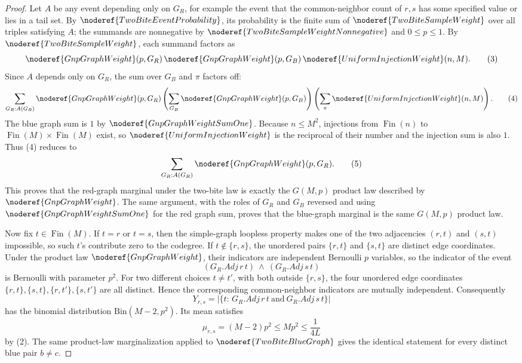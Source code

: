 \begin{proof}
Let \(A\) be any event depending only on \(G_R\), for example the event that
the common-neighbor count of \(r,s\) has some specified value or lies in a
tail set.  By \(\noderef{TwoBiteEventProbability}\), its probability is the
finite sum of \(\noderef{TwoBiteSampleWeight}\) over all triples satisfying
\(A\); the summands are nonnegative by
\(\noderef{TwoBiteSampleWeightNonnegative}\) and \(0\le p\le1\).  By
\(\noderef{TwoBiteSampleWeight}\), each summand factors as
\[
\noderef{GnpGraphWeight}(p,G_R)\,
\noderef{GnpGraphWeight}(p,G_B)\,
\noderef{UniformInjectionWeight}(n,M).
\tag{3}
\]
Since \(A\) depends only on \(G_R\), the sum over \(G_B\) and \(\pi\) factors
off:
\[
\sum_{G_R:A(G_R)} \noderef{GnpGraphWeight}(p,G_R)
\left(\sum_{G_B}\noderef{GnpGraphWeight}(p,G_B)\right)
\left(\sum_{\pi}\noderef{UniformInjectionWeight}(n,M)\right).
\tag{4}
\]
The blue graph sum is \(1\) by \(\noderef{GnpGraphWeightSumOne}\).  Because
\(n\le M^2\), injections from \(\operatorname{Fin}(n)\) to
\(\operatorname{Fin}(M)\times\operatorname{Fin}(M)\) exist, so
\(\noderef{UniformInjectionWeight}\) is the reciprocal of their number and
the injection sum is also \(1\).  Thus (4) reduces to
\[
\sum_{G_R:A(G_R)}\noderef{GnpGraphWeight}(p,G_R).
\tag{5}
\]
This proves that the red-graph marginal under the two-bite law is exactly
the \(G(M,p)\) product law described by \(\noderef{GnpGraphWeight}\).
The same argument, with the roles of \(G_R\) and \(G_B\) reversed and using
\(\noderef{GnpGraphWeightSumOne}\) for the red graph sum, proves that the
blue-graph marginal is the same \(G(M,p)\) product law.

Now fix \(t\in\operatorname{Fin}(M)\).  If \(t=r\) or \(t=s\), then the
simple-graph loopless property makes one of the two adjacencies
\((r,t)\) and \((s,t)\) impossible, so such \(t\)'s contribute zero to the
codegree.  If \(t\notin\{r,s\}\), the unordered pairs \(\{r,t\}\) and
\(\{s,t\}\) are distinct edge coordinates.  Under the product law
\(\noderef{GnpGraphWeight}\), their indicators are independent Bernoulli
\(p\) variables, so the indicator of the event
\[
(G_R.Adj\, r\, t)\ \wedge\ (G_R.Adj\, s\, t)
\]
is Bernoulli with parameter \(p^2\).  For two different choices
\(t\ne t'\), with both outside \(\{r,s\}\), the four unordered edge
coordinates \(\{r,t\},\{s,t\},\{r,t'\},\{s,t'\}\) are all distinct.  Hence
the corresponding common-neighbor indicators are mutually independent.
Consequently
\[
Y_{r,s}
=\left|\{t:\,G_R.Adj\,r\,t\ \text{and}\ G_R.Adj\,s\,t\}\right|
\]
has the binomial distribution \(\mathrm{Bin}(M-2,p^2)\).  Its mean satisfies
\[
\mu_{r,s}=(M-2)p^2\le Mp^2\le \frac1{4L}
\tag{6}
\]
by (2).  The same product-law marginalization applied to
\(\noderef{TwoBiteBlueGraph}\) gives the identical statement for every
distinct blue pair \(b\ne c\).


\end{proof}
